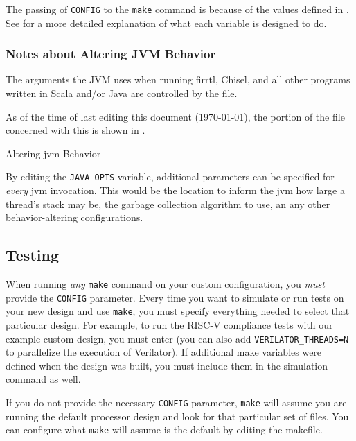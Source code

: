 The passing of \texttt{CONFIG} to the \texttt{make} command is because of the values defined in .
See  for a more detailed explanation of what each variable is designed to do.

\subsubsection{Notes about Altering JVM Behavior}\label{sec:Notes_Altering_JVM_Behavior}
The arguments the JVM uses when running \gls{firrtl}, Chisel, and all other programs written in Scala and/or Java are controlled by the  file.

As of the time of last editing this document (\today), the portion of the file concerned with this is shown in .

\begin{listing}[h!tbp]
\caption{Altering \Gls{jvm} Behavior}
\label{lst:Altering_JVM_Behavior}
\end{listing}

By editing the \texttt{JAVA_OPTS} variable, additional parameters can be specified for \emph{every} \Gls{jvm} invocation.
This would be the location to inform the \Gls{jvm} how large a thread's stack may be, the garbage collection algorithm to use, an any other behavior-altering configurations.

\subsection{Testing}\label{sec:Custom_Config-Testing}
When running \emph{any} \texttt{make} command on your custom configuration, you \emph{must} provide the \texttt{CONFIG} parameter.
Every time you want to simulate or run tests on your new design and use \texttt{make}, you must specify everything needed to select that particular design.
For example, to run the RISC-V compliance tests with our example custom design, you must enter  (you can also add \texttt{VERILATOR_THREADS=N} to parallelize the execution of Verilator).
If additional make variables were defined when the design was built, you must include them in the simulation command as well.

\begin{blackbox}
  If you do not provide the necessary \texttt{CONFIG} parameter, \texttt{make} will assume you are running the default processor design and look for that particular set of files.
  You can configure what \texttt{make} will assume is the default by editing the  makefile.
\end{blackbox}

